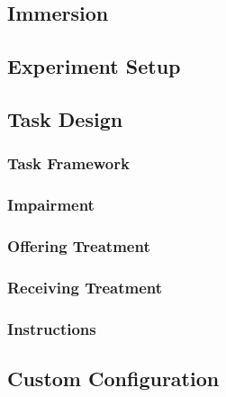 \documentclass{article}
\begin{document}
\subsection*{Immersion} %

\subsection*{Experiment Setup} %

\subsection{Task Design}
\subsubsection*{Task Framework} %
\subsubsection*{Impairment} %
\subsubsection*{Offering Treatment} %
\subsubsection*{Receiving Treatment} %
\subsubsection*{Instructions} %

\subsection*{Custom Configuration} %
\end{document}
